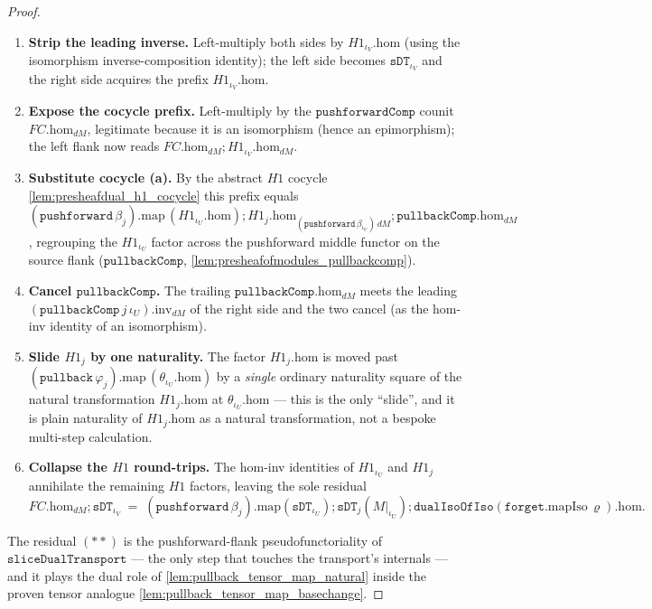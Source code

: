 \begin{proof}
  \begin{enumerate}
    \item \textbf{Strip the leading inverse.} Left-multiply both sides by
      \(H1_{\iota_V}.\mathrm{hom}\) (using the isomorphism inverse-composition identity); the left side
      becomes \(\mathtt{sDT}_{\iota_V}\) and the right side acquires the prefix
      \(H1_{\iota_V}.\mathrm{hom}\).
    \item \textbf{Expose the cocycle prefix.} Left-multiply by the \(\mathtt{pushforwardComp}\) counit
      \(FC.\mathrm{hom}_{dM}\), legitimate because it is an isomorphism (hence an epimorphism); the
      left flank now reads \(FC.\mathrm{hom}_{dM} \mathbin{;} H1_{\iota_V}.\mathrm{hom}_{dM}\).
    \item \textbf{Substitute cocycle (a).} By the abstract \(H1\) cocycle
      \cref{lem:presheafdual_h1_cocycle} this prefix equals
      \((\mathtt{pushforward}\,\beta_j).\mathrm{map}\,(H1_{\iota_U}.\mathrm{hom})
        \mathbin{;} H1_j.\mathrm{hom}_{(\mathtt{pushforward}\,\beta_{\iota_U})\,dM}
        \mathbin{;} \mathtt{pullbackComp}.\mathrm{hom}_{dM}\),
      regrouping the \(H1_{\iota_U}\) factor across the pushforward middle functor on the source flank
      (\(\mathtt{pullbackComp}\), \cref{lem:presheafofmodules_pullbackcomp}).
    \item \textbf{Cancel \(\mathtt{pullbackComp}\).} The trailing
      \(\mathtt{pullbackComp}.\mathrm{hom}_{dM}\) meets the leading
      \((\mathtt{pullbackComp}\,j\,\iota_U).\mathrm{inv}_{dM}\) of the right side and the two cancel
      (as the hom-inv identity of an isomorphism).
    \item \textbf{Slide \(H1_j\) by one naturality.} The factor \(H1_j.\mathrm{hom}\) is moved past
      \((\mathtt{pullback}\,\varphi_j).\mathrm{map}\,(\theta_{\iota_U}.\mathrm{hom})\) by a \emph{single}
      ordinary naturality square of the natural transformation \(H1_j.\mathrm{hom}\) at
      \(\theta_{\iota_U}.\mathrm{hom}\) --- this is the only ``slide'', and it is plain
      naturality of \(H1_j.\mathrm{hom}\) as a natural transformation, not a bespoke multi-step calculation.
    \item \textbf{Collapse the \(H1\) round-trips.} The hom-inv identities of
      \(H1_{\iota_U}\) and \(H1_j\) annihilate the remaining \(H1\) factors, leaving the sole residual
      \begin{equation}
        FC.\mathrm{hom}_{dM} \mathbin{;} \mathtt{sDT}_{\iota_V}
          \;=\;
        (\mathtt{pushforward}\,\beta_j).\mathrm{map}(\mathtt{sDT}_{\iota_U})
          \mathbin{;} \mathtt{sDT}_j(M|_{\iota_U})
          \mathbin{;} \mathtt{dualIsoOfIso}(\mathtt{forget}.\mathrm{mapIso}\,\varrho).\mathrm{hom}.
        \tag{$**$}
      \end{equation}
  \end{enumerate}
  The residual \((**)\) is the pushforward-flank pseudofunctoriality of
  \(\mathtt{sliceDualTransport}\) --- the only step that touches the transport's internals --- and it
  plays the dual role of \cref{lem:pullback_tensor_map_natural} inside the proven tensor analogue
  \cref{lem:pullback_tensor_map_basechange}.


\end{proof}
